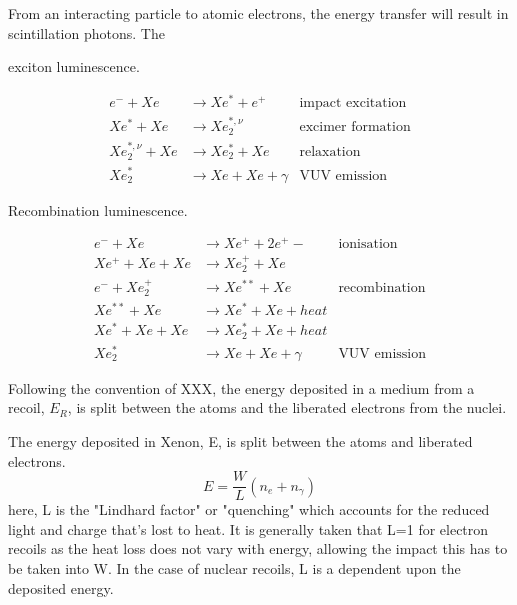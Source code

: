 From an interacting particle to atomic electrons, the energy transfer will result in scintillation photons.
The 

exciton luminescence.

\begin{align*}
    e^- + Xe &\rightarrow Xe^* + e^+  &\text{impact excitation} \\ 
    Xe^* + Xe &\rightarrow Xe_2^{*,\nu} &\text{excimer formation} \\
    Xe_2^{*,\nu} + Xe &\rightarrow Xe_2^* + Xe &\text{relaxation} \\
    Xe_2^* &\rightarrow Xe + Xe + \gamma &\text{VUV emission} 
\end{align*}


Recombination luminescence.

\begin{align*}
    e^- + Xe &\rightarrow Xe^+ + 2e^+- &\text{ionisation} \\ 
    Xe^+ + Xe + Xe &\rightarrow Xe_2^{+} + Xe &\text{ } \\
    e^- + Xe_2^+ &\rightarrow Xe^{**} + Xe &\text{recombination} \\
    Xe^{**} + Xe &\rightarrow Xe^{*} + Xe + heat &\text{ } \\
    Xe^{*} + Xe + Xe &\rightarrow Xe_2^{*} + Xe + heat &\text{ } \\
    Xe_2^* &\rightarrow Xe + Xe + \gamma &\text{VUV emission} 
\end{align*}

Following the convention of XXX, the energy deposited in a medium from a recoil, $E_R$, is split between the atoms and the liberated electrons from the nuclei. 




The energy deposited in Xenon, E, is split between the atoms and liberated electrons.
\begin{equation}
    E = \frac{W}{L}(n_e + n_\gamma)
\end{equation}
here, L is the "Lindhard factor" or "quenching" which accounts for the reduced light and charge that's lost to heat.
It is generally taken that L=1 for electron recoils as the heat loss does not vary with energy, allowing the impact this has to be taken into W.
In the case of nuclear recoils, L is a dependent upon the deposited energy.


